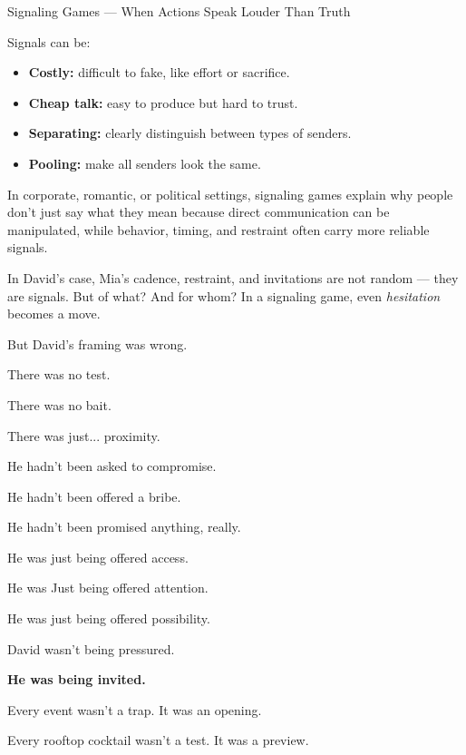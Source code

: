 \begin{TechnicalSidebar}{Signaling Games --- When Actions Speak Louder Than Truth}
    \medskip
    
    Signals can be:

    \medskip

    \begin{itemize}
      \item \textbf{Costly:} difficult to fake, like effort or sacrifice.
      \item \textbf{Cheap talk:} easy to produce but hard to trust.
      \item \textbf{Separating:} clearly distinguish between types of senders.
      \item \textbf{Pooling:} make all senders look the same.
    \end{itemize}
    
    \medskip
    
    In corporate, romantic, or political settings, signaling games explain why people don’t just say 
    what they mean because direct communication can be manipulated, while behavior, timing, and restraint 
    often carry more reliable signals.

    \medskip
    
    
    In David’s case, Mia’s cadence, restraint, and invitations are not random — 
    they are signals. But of what? And for whom? 
    In a signaling game, even \emph{hesitation} becomes a move.  
    
\end{TechnicalSidebar}

\medskip

But David's framing was wrong.

There was no test.

There was no bait.

There was just... proximity.

He hadn’t been asked to compromise.

He hadn’t been offered a bribe.

He hadn’t been promised anything, really.

He was just being offered access.

He was Just being offered attention.

He was just being offered possibility.

David wasn't being pressured. 

\textbf{He was being invited.}

Every event wasn’t a trap. It was an opening.

Every rooftop cocktail wasn’t a test. It was a preview.  

